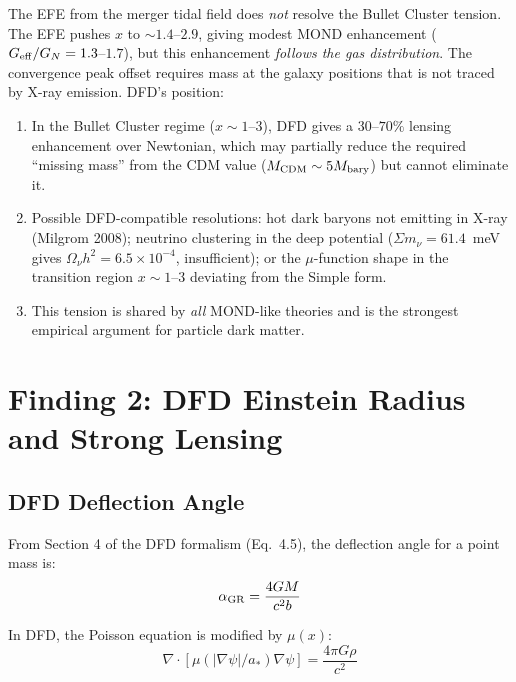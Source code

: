 \documentclass[11pt,a4paper]{article}
\newcommand{\Geff}{G_{\rm eff}}
\newcommand{\ee}[1]{\times 10^{#1}}
\begin{document}
\begin{tcolorbox}[colback=red!5!white, colframe=red!70!black,
  title=\textbf{HONEST NEGATIVE: Bullet Cluster Remains an Open Problem}]
The EFE from the merger tidal field does \emph{not} resolve the Bullet
Cluster tension.  The EFE pushes $x$ to $\sim 1.4$--$2.9$, giving modest
MOND enhancement ($\Geff/G_N = 1.3$--$1.7$), but this enhancement
\emph{follows the gas distribution}.  The convergence peak offset
requires mass at the galaxy positions that is not traced by X-ray
emission.  DFD's position:
\begin{enumerate}[label=(\alph*)]
\item In the Bullet Cluster regime ($x \sim 1$--$3$), DFD gives a
  $30$--$70\%$ lensing enhancement over Newtonian, which may partially
  reduce the required ``missing mass'' from the CDM value
  ($M_{\rm CDM} \sim 5 M_{\rm bary}$) but cannot eliminate it.
\item Possible DFD-compatible resolutions: hot dark baryons not emitting
  in X-ray (Milgrom 2008); neutrino clustering in the deep potential
  ($\Sigma m_\nu = 61.4$~meV gives $\Omega_\nu h^2 = 6.5\ee{-4}$,
  insufficient); or the $\mu$-function shape in the transition region
  $x \sim 1$--$3$ deviating from the Simple form.
\item This tension is shared by \emph{all} MOND-like theories and is
  the strongest empirical argument for particle dark matter.
\end{enumerate}
\end{tcolorbox}


\section{Finding 2: DFD Einstein Radius and Strong Lensing}
\label{sec:strong-lensing}

\subsection{DFD Deflection Angle}

From Section 4 of the DFD formalism (Eq.~4.5), the deflection angle
for a point mass is:
\begin{equation}
\alpha_{\rm GR} = \frac{4GM}{c^2 b}
\end{equation}

In DFD, the Poisson equation is modified by $\mu(x)$:
\begin{equation}
\nabla\cdot[\mu(|\nabla\psi|/a_*)\nabla\psi] = \frac{4\pi G\rho}{c^2}
\end{equation}
\end{document}
